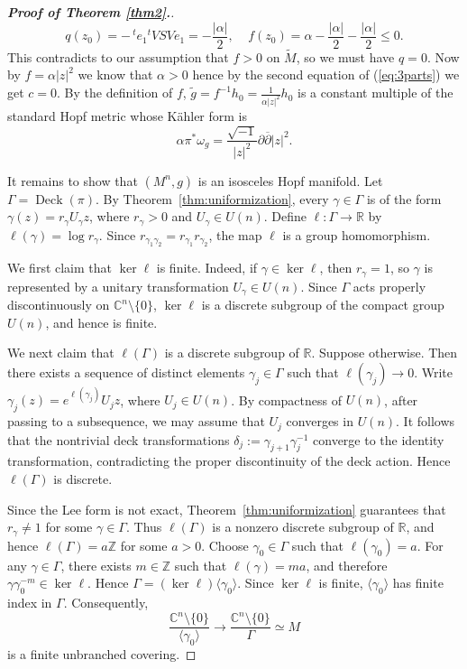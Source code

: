 \documentclass{amsart}
\numberwithin{equation}{section}
\begin{document}
\begin{proof}[{\bf Proof of Theorem \ref{thm2}.}]
$$ q(z_0) = - \,^t\!e_1\mbox{}^t\!V S V e_1 = -\frac{|\alpha|}{2}, \ \ \ \ \ f(z_0) = \alpha  -\frac{|\alpha|}{2} -\frac{|\alpha|}{2} \le 0. $$
This contradicts to our assumption that $f>0$ on $\widetilde M$, so we must have $q=0$. Now by $f=\alpha |z|^2$ we know  that $\alpha >0$ hence by the second equation of (\ref{eq:3parts}) we get $c=0$. By the definition of $f$, $\widetilde g = f^{-1}h_0 = \frac{1}{\alpha |z|^2} h_0$ is a constant multiple of the standard Hopf metric whose K\"ahler form is
$$ \alpha \pi^{\ast} \omega_g = \frac{\sqrt{-1}}{|z|^2} \partial \overline{\partial} |z|^2. $$




It remains to show that $(M^n,g)$ is an isosceles Hopf manifold. Let $\Gamma=\operatorname{Deck}(\pi)$. By Theorem~\ref{thm:uniformization}, every $\gamma\in\Gamma$ is of the form $\gamma(z)=r_\gamma U_\gamma z$, where $r_\gamma>0$ and $U_\gamma\in U(n)$. Define $\ell:\Gamma\to\mathbb R$ by $\ell(\gamma)=\log r_\gamma$. Since $r_{\gamma_1\gamma_2}=r_{\gamma_1}r_{\gamma_2}$, the map $\ell$ is a group homomorphism.

We first claim that $\ker\ell$ is finite. Indeed, if $\gamma\in\ker\ell$, then $r_\gamma=1$, so $\gamma$ is represented by a unitary transformation $U_\gamma\in U(n)$. Since $\Gamma$ acts properly discontinuously on $\mathbb C^n\setminus\{0\}$, $\ker\ell$ is a discrete subgroup of the compact group $U(n)$, and hence is finite.

We next claim that $\ell(\Gamma)$ is a discrete subgroup of $\mathbb R$. Suppose otherwise. Then there exists a sequence of distinct elements $\gamma_j\in\Gamma$ such that $\ell(\gamma_j)\to0$. Write $\gamma_j(z)=e^{\ell(\gamma_j)}U_jz$, where $U_j\in U(n)$. By compactness of $U(n)$, after passing to a subsequence, we may assume that $U_j$ converges in $U(n)$. It follows that the nontrivial deck transformations $\delta_j:=\gamma_{j+1}\gamma_j^{-1}$ converge to the identity transformation, contradicting the proper discontinuity of the deck action. Hence $\ell(\Gamma)$ is discrete.

Since the Lee form is not exact, Theorem~\ref{thm:uniformization} guarantees that $r_\gamma\neq1$ for some $\gamma\in\Gamma$. Thus $\ell(\Gamma)$ is a nonzero discrete subgroup of $\mathbb R$, and hence $\ell(\Gamma)=a\mathbb Z$ for some $a>0$. Choose $\gamma_0\in\Gamma$ such that $\ell(\gamma_0)=a$. For any $\gamma\in\Gamma$, there exists $m\in\mathbb Z$ such that $\ell(\gamma)=ma$, and therefore $\gamma\gamma_0^{-m}\in\ker\ell$. Hence $\Gamma=(\ker\ell)\langle\gamma_0\rangle$. Since $\ker\ell$ is finite, $\langle\gamma_0\rangle$ has finite index in $\Gamma$. Consequently,
$$ \frac{\mathbb C^n\setminus\{0\}}{\langle\gamma_0\rangle} \longrightarrow \frac{\mathbb C^n\setminus\{0\}}{\Gamma}\simeq M $$
is a finite unbranched covering.


\end{proof}
\end{document}
